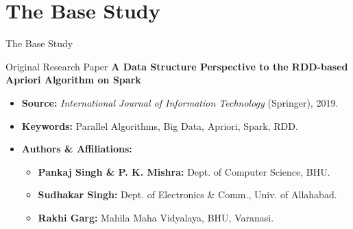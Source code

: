
\section{The Base Study}
\begin{frame}{The Base Study}
    \vspace{-0.2cm} 
    \begin{alertblock}{Original Research Paper}
        \centering
        \textbf{A Data Structure Perspective to the RDD-based Apriori Algorithm on Spark}
    \end{alertblock}
    
    \vspace{0.1cm}
    
    \begin{itemize}
        \setlength{\itemsep}{2pt}
        \item \textbf{Source:} \textit{International Journal of Information Technology} (Springer), 2019.
        \item \textbf{Keywords:} Parallel Algorithms, Big Data, Apriori, Spark, RDD.
        \item \textbf{Authors \& Affiliations:} \hspace{0.1cm} 
        \begin{itemize}
            \setlength{\itemsep}{0pt}
            \scriptsize
            \item \textbf{Pankaj Singh \& P. K. Mishra:} Dept. of Computer Science, BHU.
            \item \textbf{Sudhakar Singh:} Dept. of Electronics \& Comm., Univ. of Allahabad.
            \item \textbf{Rakhi Garg:} Mahila Maha Vidyalaya, BHU, Varanasi.
        \end{itemize}
    \end{itemize}

    \vspace{0.2cm}


\end{frame}
